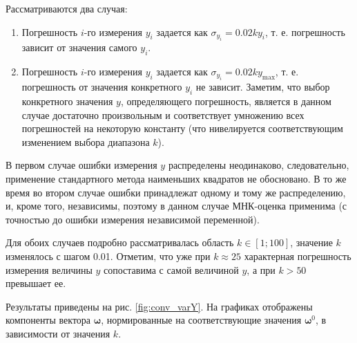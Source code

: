 \documentclass[tikz,10pt,a4paper]{article}
\newcommand{\bomega}{\boldsymbol{\omega}}
\begin{document}
Рассматриваются два случая:
\begin{enumerate}
  \item Погрешность $i$-го измерения $y_i$ задается как $\sigma_{y_i} = 0.02ky_i$, т. е.
	погрешность зависит от значения самого $y_i$.
  \item Погрешность $i$-го измерения $y_i$ задается как $\sigma_{y_i} = 0.02ky_{\max}$,
	т. е. погрешность от значения конкретного $y_i$ не зависит. Заметим, что выбор
	конкретного значения $y$, определяющего погрешность, является в данном случае
	достаточно произвольным и соответствует умножению всех погрешностей на некоторую константу
	(что нивелируется соответствующим изменением выбора диапазона $k$).
\end{enumerate}

В первом случае ошибки измерения $y$ распределены неодинаково, следовательно, применение
стандартного метода наименьших квадратов не обосновано. В то же время во втором случае
ошибки принадлежат одному и тому же распределению, и, кроме того, независимы, поэтому
в данном случае МНК-оценка применима (с точностью до ошибки измерения независимой
переменной).

Для обоих случаев подробно рассматривалась область $k \in [1; 100]$, значение $k$
изменялось с шагом 0.01. Отметим, что уже при $k \approx 25$ характерная погрешность
измерения величины $y$ сопоставима с самой величиной $y$, а при $k > 50$ превышает ее.

Результаты приведены на рис. \ref{fig:conv_varY}.
На графиках отображены компоненты вектора $\bomega$, нормированные на
соответствующие значения $\bomega^0$, в зависимости от значения $k$.
\end{document}
